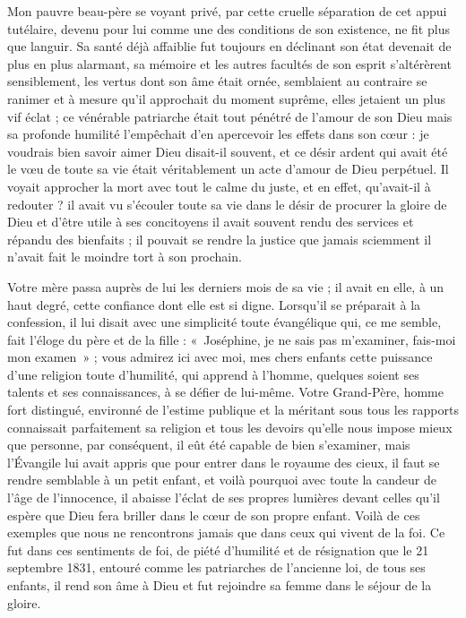 \documentclass[11pt,a4paper]{report}
\begin{document}
Mon pauvre beau-père se voyant privé, par cette cruelle séparation de cet appui tutélaire, devenu pour lui comme une des conditions de son existence, ne fit plus que languir. Sa santé déjà affaiblie fut toujours en déclinant son état devenait de plus en plus alarmant, sa mémoire et les autres facultés de son esprit s'altérèrent sensiblement, les vertus dont son âme était ornée, semblaient au contraire se ranimer et à mesure qu'il approchait du moment suprême, elles jetaient un plus vif éclat ; ce vénérable patriarche était tout pénétré de l'amour de son Dieu mais sa profonde humilité l'empêchait d'en apercevoir les effets dans son cœur : je voudrais bien savoir aimer Dieu disait-il souvent, et ce désir ardent qui avait été le vœu de toute sa vie était véritablement un acte d'amour de Dieu perpétuel. Il voyait approcher la mort avec tout le calme du juste, et en effet, qu'avait-il à redouter ? il avait vu s'écouler toute sa vie dans le désir de procurer la gloire de Dieu et d'être utile à ses concitoyens il avait souvent rendu des services et répandu des bienfaits ; il pouvait se rendre la justice que jamais sciemment il n'avait fait le moindre tort à son prochain.

Votre mère passa auprès de lui les derniers mois de sa vie ; il avait en elle, à un haut degré, cette confiance dont elle est si digne. Lorsqu'il se préparait à la confession, il lui disait avec une simplicité toute évangélique qui, ce me semble, fait l'éloge du père et de la fille : «~Joséphine, je ne sais pas m'examiner, fais-moi mon examen~» ; vous admirez ici avec moi, mes chers enfants cette puissance d'une religion toute d'humilité, qui apprend à l'homme, quelques soient ses talents et ses connaissances, à se défier de lui-même. Votre Grand-Père, homme fort distingué, environné de l'estime publique et la méritant sous tous les rapports connaissait parfaitement sa religion et tous les devoirs qu'elle nous impose mieux que personne, par conséquent, il eût été capable de bien s'examiner, mais l'Évangile lui avait appris que pour entrer dans le royaume des cieux, il faut se rendre semblable à un petit enfant, et voilà pourquoi avec toute la candeur de l'âge de l'innocence, il abaisse l'éclat de ses propres lumières devant celles qu'il espère que Dieu fera briller dans le cœur de son propre enfant. Voilà de ces exemples que nous ne rencontrons jamais que dans ceux qui vivent de la foi. Ce fut dans ces sentiments de foi, de piété d'humilité et de résignation que le 21 septembre 1831, entouré comme les patriarches de l'ancienne loi, de tous ses enfants, il rend son âme à Dieu et fut rejoindre sa femme dans le séjour de la gloire.
\end{document}

